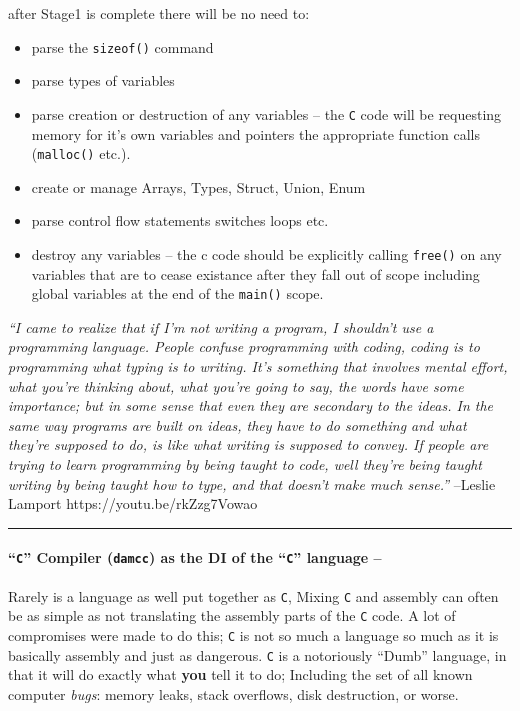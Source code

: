 after Stage1 is complete there will be no need to:

\begin{itemize}
\tightlist
\item
  parse the \texttt{sizeof()} command
\item
  parse types of variables
\item
  parse creation or destruction of any variables -- the \texttt{C} code
  will be requesting memory for it's own variables and pointers the
  appropriate function calls (\texttt{malloc()} etc.).
\item
  create or manage Arrays, Types, Struct, Union, Enum
\item
  parse control flow statements switches loops etc.
\item
  destroy any variables -- the c code should be explicitly calling
  \texttt{free()} on any variables that are to cease existance after
  they fall out of scope including global variables at the end of the
  \texttt{main()} scope.
\end{itemize}

\emph{``I came to realize that if I'm not writing a program, I shouldn't
use a programming language. People confuse programming with coding,
coding is to programming what typing is to writing. It's something that
involves mental effort, what you're thinking about, what you're going to
say, the words have some importance; but in some sense that even they
are secondary to the ideas. In the same way programs are built on ideas,
they have to do something and what they're supposed to do, is like what
writing is supposed to convey. If people are trying to learn programming
by being taught to code, well they're being taught writing by being
taught how to type, and that doesn't make much sense.''} --Leslie
Lamport https://youtu.be/rkZzg7Vowao

\begin{center}\rule{0.5\linewidth}{0.5pt}\end{center}

\hypertarget{c-compiler-damcc-as-the-di-of-the-c-language}{%
\paragraph{\texorpdfstring{``\texttt{C}'' Compiler (\texttt{damcc}) as
the DI of the ``\texttt{C}'' language
--}{``C'' Compiler (damcc) as the DI of the ``C'' language --}}\label{c-compiler-damcc-as-the-di-of-the-c-language}}

Rarely is a language as well put together as \texttt{C}, Mixing
\texttt{C} and assembly can often be as simple as not translating the
assembly parts of the \texttt{C} code. A lot of compromises were made to
do this; \texttt{C} is not so much a language so much as it is basically
assembly and just as dangerous. \texttt{C} is a notoriously ``Dumb''
language, in that it will do exactly what \textbf{you} tell it to do;
Including the set of all known computer \emph{bugs}: memory leaks, stack
overflows, disk destruction, or worse.

